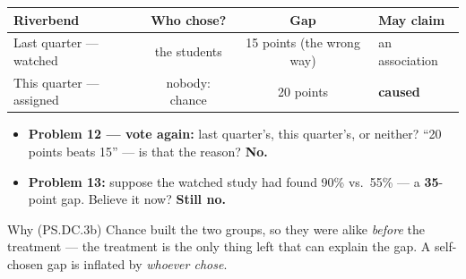 \documentclass[aspectratio=169, 11pt]{beamer}
\newcommand{\redink}[1]{{\color{redacc}\bfseries #1}}
\begin{document}
\begin{frame}[t, plain]
  \vspace{4pt}
  \begin{center}
    \small
    \renewcommand{\arraystretch}{1.3}
    \begin{tabular}{@{} l c c l @{}}
    \hline
    \textbf{Riverbend} & \textbf{Who chose?} & \textbf{Gap} & \textbf{May claim} \\
    \hline
    Last quarter --- watched  & the students & 15 points (the wrong way) & an association \\
    This quarter --- assigned & nobody: chance & 20 points & \textbf{caused} \\
    \hline
    \end{tabular}
  \end{center}
  \vspace{6pt}
  \begin{itemize}\setlength{\itemsep}{4pt}
    \item \textbf{Problem 12 --- vote again:} last quarter's, this quarter's, or neither?
          ``20 points beats 15'' --- is that the reason? \redink{No.}
    \item \textbf{Problem 13:} suppose the watched study had found 90\% vs.\ 55\% --- a
          \textbf{35}-point gap. Believe it now? \redink{Still no.}
  \end{itemize}
  \begin{block}{Why (PS.DC.3b)}
    Chance built the two groups, so they were alike \emph{before} the treatment --- the
    treatment is the only thing left that can explain the gap. A self-chosen gap is inflated
    by \emph{whoever chose}.
  \end{block}
\end{frame}
\end{document}

